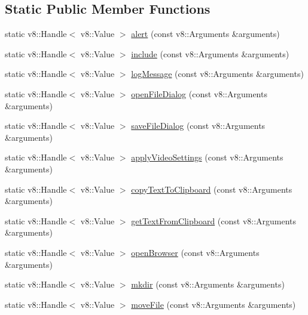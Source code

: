 \subsection*{Static Public Member Functions}
\begin{DoxyCompactItemize}
\item 
static v8\-::\-Handle$<$ v8\-::\-Value $>$ \hyperlink{class_rad_xml_1_1_global_class_a231af5c7676ebd19988d055e118d0ae5}{alert} (const v8\-::\-Arguments \&arguments)
\item 
static v8\-::\-Handle$<$ v8\-::\-Value $>$ \hyperlink{class_rad_xml_1_1_global_class_a0a92124ee604dc74295a7ae01f1327da}{include} (const v8\-::\-Arguments \&arguments)
\item 
static v8\-::\-Handle$<$ v8\-::\-Value $>$ \hyperlink{class_rad_xml_1_1_global_class_a116439044b06d2adf473d77c3478cf25}{log\-Message} (const v8\-::\-Arguments \&arguments)
\item 
static v8\-::\-Handle$<$ v8\-::\-Value $>$ \hyperlink{class_rad_xml_1_1_global_class_a3276923df91de244983fa3ec2eeb19ca}{open\-File\-Dialog} (const v8\-::\-Arguments \&arguments)
\item 
static v8\-::\-Handle$<$ v8\-::\-Value $>$ \hyperlink{class_rad_xml_1_1_global_class_a0aeaeccf8d0fe0afa386f164f4a258db}{save\-File\-Dialog} (const v8\-::\-Arguments \&arguments)
\item 
static v8\-::\-Handle$<$ v8\-::\-Value $>$ \hyperlink{class_rad_xml_1_1_global_class_a1d460d75a1cf950310305ff0ee3d9c22}{apply\-Video\-Settings} (const v8\-::\-Arguments \&arguments)
\item 
static v8\-::\-Handle$<$ v8\-::\-Value $>$ \hyperlink{class_rad_xml_1_1_global_class_aa1ac78d2724794ff7e1682cb80003652}{copy\-Text\-To\-Clipboard} (const v8\-::\-Arguments \&arguments)
\item 
static v8\-::\-Handle$<$ v8\-::\-Value $>$ \hyperlink{class_rad_xml_1_1_global_class_a8c43889e8671bb95c6c323f70400e2c0}{get\-Text\-From\-Clipboard} (const v8\-::\-Arguments \&arguments)
\item 
static v8\-::\-Handle$<$ v8\-::\-Value $>$ \hyperlink{class_rad_xml_1_1_global_class_ab3a46337e22572f1bf4fc0dcafe80ca4}{open\-Browser} (const v8\-::\-Arguments \&arguments)
\item 
static v8\-::\-Handle$<$ v8\-::\-Value $>$ \hyperlink{class_rad_xml_1_1_global_class_ad51d1c438bddb16088f52a374cc7b448}{mkdir} (const v8\-::\-Arguments \&arguments)
\item 
static v8\-::\-Handle$<$ v8\-::\-Value $>$ \hyperlink{class_rad_xml_1_1_global_class_a0386f86d5b25248aae08e954bfd535cb}{move\-File} (const v8\-::\-Arguments \&arguments)

\end{DoxyCompactItemize}
